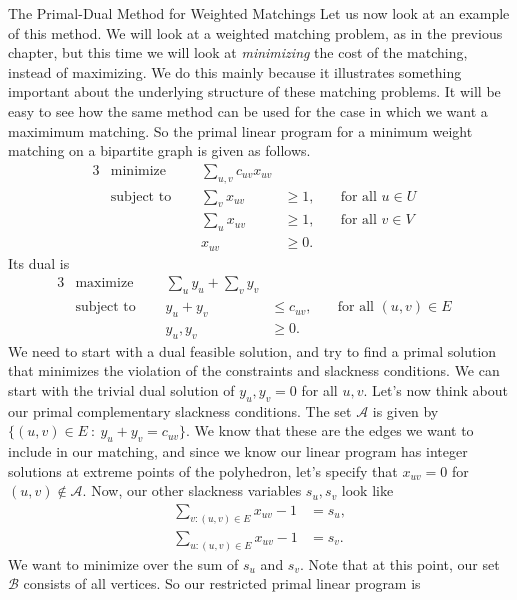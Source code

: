 \begin{section}{The Primal-Dual Method for Weighted Matchings}
	Let us now look at an example of this method. We will look at a weighted matching problem, as 
	in the previous chapter, but this time we will look at \emph{minimizing} the cost of the 
	matching, instead of maximizing. We do this mainly because it illustrates something important 
	about the underlying structure of these matching problems. It will be easy to see how the 
	same method can be used for the case in which we want a maximimum matching. So the primal 
	linear program for a minimum weight matching on a bipartite graph is given as follows. 
	\begin{alignat}{3}
		& \text{minimize } & \sum_{u,v} c_{uv} x_{uv}& \\
		& \text{subject to } \quad & \sum_{v} x_{uv} & \geq 1, & \quad \text{for all } u\in U& \\
				     &\quad & \sum_{u} x_{uv} & \geq 1, & \quad \text{for all } v\in 
				     V & \\
				&& x_{uv} & \geq 0.
	\end{alignat}
	Its dual is
	\begin{alignat}{3}
		& \text{maximize } & \sum_{u}y_u + \sum_{v}y_v & \\
		& \text{subject to } \quad & y_u + y_v & \leq c_{uv}, & \quad \text{for all }
					(u,v)\in E & \\
				    && y_u,y_v & \geq 0.
	\end{alignat}
	We need to start with a dual feasible solution, and try to find a primal solution that 
	minimizes the violation of the constraints and slackness conditions. We can start with the 
	trivial dual solution of $y_u,y_v = 0$ for all $u,v$. Let's now think about our primal 
	complementary slackness conditions. 
	The set $\mathcal{A}$ is given by $\{(u,v)\in E\ :\ y_u + y_v = c_{uv}\}$. 
	We know that these are the edges we want to include in our matching, and since we know our 
	linear program has integer solutions at extreme points of the polyhedron, let's specify that 
	$x_{uv} = 0$ for $(u,v)\notin \mathcal{A}$. Now, our other slackness variables $s_u,s_v$ look 
	like 
	\begin{align*}
		\sum_{v:(u,v)\in E} x_{uv} - 1 &= s_u, \\
		\sum_{u:(u,v)\in E} x_{uv} - 1 &= s_v.
	\end{align*}
	We want to minimize over the sum of $s_u$ and $s_v$. Note that at this point, our set 
	$\mathcal{B}$ 
	consists of all vertices. So our restricted primal linear program is

\end{section}
